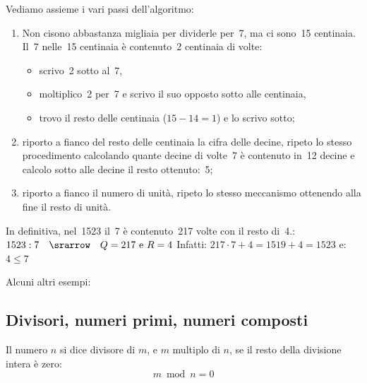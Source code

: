Vediamo assieme i vari passi dell'algoritmo:
\begin{enumerate} [noitemsep]
\item Non cisono abbastanza migliaia per dividerle per~7, ma ci sono~15 
centinaia. 
Il~7 nelle~15 centinaia è contenuto~2 centinaia di volte:
  \begin{itemize} [nosep]
  \item scrivo~2 sotto al~7,
  \item moltiplico~2 per~7 e scrivo il suo opposto sotto alle centinaia,
  \item trovo il resto delle centinaia (\(15-14=1\)) e lo scrivo sotto;
  \end{itemize}
\item riporto a fianco del resto delle centinaia la cifra delle decine, 
ripeto lo stesso procedimento calcolando quante decine di volte~7 è 
contenuto in~12 decine e calcolo sotto alle decine il resto ottenuto:~5;
\item riporto a fianco il numero di unità, ripeto lo stesso meccanismo 
ottenendo alla fine il resto di unità.
\end{enumerate}

In definitiva, nel~1523 il~7 è contenuto~217 volte con il resto di~4.:\\
\(1523:7 \quad \srarrow \quad Q=217 \text{ e } R=4\) \quad
Infatti: \(217 \cdot 7 + 4 = 1519 + 4 = 1523\)
e: \(4 \leqslant 7\)

\pagebreak %
Alcuni altri esempi:

\vspace{-6pt}
\begin{center}
\begin{inaccessibleblock}
\divintb
\end{inaccessibleblock}
\end{center}
\vspace{-12pt}

\subsection{Divisori, numeri primi, numeri composti}


\begin{definizione}{}{}
Il numero \(n\) si dice divisore di \(m\), e \(m\) multiplo di \(n\),
se il resto della divisione intera è zero: 
\[m \bmod n = 0\]
\end{definizione}

